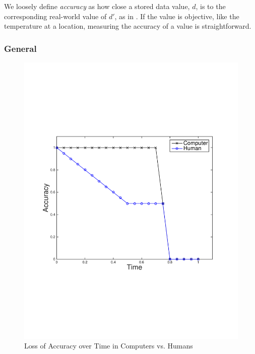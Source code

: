 We loosely define \emph{accuracy} as how close a stored data value, $d$, is to the corresponding real-world value of $d'$, as in \cite{batini2009methodologies}.  If the value is objective, like the temperature at a location, measuring the accuracy of a value is straightforward. 

\subsubsection{General}
\begin{figure}
\begin{centering}
    \includegraphics[clip=true, trim = 15mm 65mm 25mm 70mm, scale=0.40]{figures/example_qoi_trends/accuracy_hvc_2.pdf}
    \caption{Loss of Accuracy over Time in Computers vs. Humans }
    \label{fig:acc_vs_time_hvc_gen}
\end{centering}
\end{figure}

